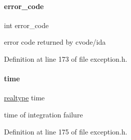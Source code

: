 \paragraph{\texorpdfstring{error\_code}{error\_code}}
{\footnotesize\ttfamily int error\+\_\+code}

error code returned by cvode/ida 

Definition at line 173 of file exception.\+h.

\mbox{\label{classamici_1_1_integration_failure_b_a6dcdb92539544d894bdc153b3ba8bea6}} 
\paragraph{\texorpdfstring{time}{time}}
{\footnotesize\ttfamily \mbox{\hyperlink{namespaceamici_a1bdce28051d6a53868f7ccbf5f2c14a3}{realtype}} time}

time of integration failure 

Definition at line 175 of file exception.\+h.


